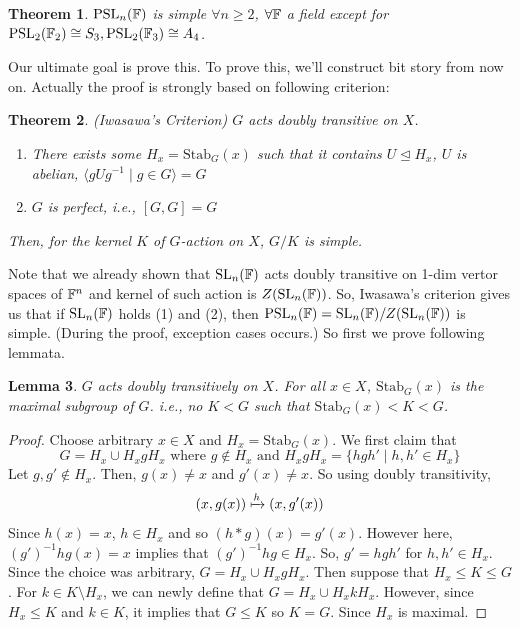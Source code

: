 \documentclass[12pt, letterpaper]{amsart}
\newtheorem{thm}{Theorem}[section]
\newtheorem{lem}[thm]{Lemma}
\theoremstyle{definition}
\theoremstyle{remark}
\newcommand{\PSL}{{\mathrm{PSL}}}
\newcommand{\Stab}{\mathrm{Stab}}
\theoremstyle{plain}
\newcommand{\normal}{\trianglelefteq}
\numberwithin{equation}{section}
\begin{document}
\hrulefill

\begin{thm}
    $\PSL_n(\BF)$ is simple $\forall n \geq 2$, $\forall {\mathbb {F}}$ a field except for $\PSL_2(\BF_2) \cong S_3, \PSL_2(\BF_3) \cong A_4$. 
\end{thm}

Our ultimate goal is prove this. To prove this, we'll construct bit story from now on. 
Actually the proof is strongly based on following criterion: 

\begin{thm}{(Iwasawa's Criterion)}
    $G$ acts doubly transitive on $X$. 
    \begin{enumerate}
        \item There exists some $H_x = \Stab_G(x)$ such that it contains $U \normal H_x$, $U$ is abelian, $\langle gUg^{-1} \mid g \in G \rangle = G$ 
        \item $G$ is perfect, i.e., $[G, G] = G$
    \end{enumerate}
    Then, for the kernel $K$ of $G$-action on $X$, $G/K$ is simple. 
\end{thm}

Note that we already shown that ${\mathrm{SL}}_n({\mathbb {F}})$ acts doubly transitive on 1-dim vertor spaces of ${\mathbb {F}}^n$ 
and kernel of such action is $Z({\mathrm{SL}}_n({\mathbb {F}}))$. So, Iwasawa's criterion gives us that 
if ${\mathrm{SL}}_n({\mathbb {F}})$ holds (1) and (2), then $\PSL_n(\BF) = \SL_n(\BF)/Z(\SL_n(\BF))$ is simple. (During the proof, exception cases occurs.)
So first we prove following lemmata. 

\hrulefill

\begin{lem}
    $G$ acts doubly transitively on $X$. For all $x \in X$, $\Stab_G(x)$ is the maximal subgroup of $G$. 
    i.e., no $K < G$ such that $\Stab_G(x) < K < G$. 
\end{lem}

\begin{proof}
    Choose arbitrary $x \in X$ and $H_x = \Stab_G(x)$. 
    We first claim that 
    \[G = H_x \cup H_x g H_x \text{ where $g \notin H_x$ and $H_x g H_x = \{ hgh' \mid h, h' \in H_x\}$}\]
    Let $g, g' \notin H_x$. Then, $g(x) \neq x$ and $g'(x) \neq x$. So using doubly transitivity, 
    \[(x, g(x)) \xmapsto{h} (x, g'(x))\]
    Since $h(x) = x$, $h \in H_x$ and so $(h * g)(x) = g'(x)$. 
    However here, $(g')^{-1}hg (x) = x$ implies that $(g')^{-1} h g \in H_x$. 
    So, $g' = hgh'$ for $h, h' \in H_x$. Since the choice was arbitrary, $G = H_x \cup H_xgH_x$. 
    Then suppose that $H_x \leq K \leq G$. For $k \in K \setminus H_x$, 
    we can newly define that $G = H_x \cup H_x k H_x$. However, since $H_x \leq K$ and $k \in K$, 
    it implies that $G \leq K$ so $K = G$. Since $H_x$ is maximal. 
\end{proof}
\end{document}
